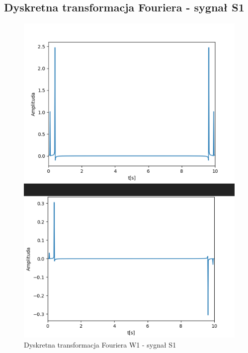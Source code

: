 \documentclass[12pt]{article}
\begin{document}
\subsection{Dyskretna transformacja Fouriera - sygnał S1}
\begin{figure}[H]
\centering
\includegraphics[scale=0.6]{s1DyskrW1.png}
\caption{Dyskretna transformacja Fouriera W1 - sygnał S1}
\end{figure}
\end{document}
